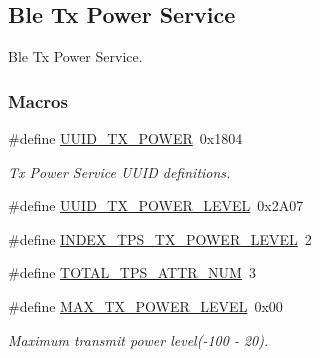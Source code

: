 \hypertarget{group___b_l_e___t_p_s}{}\subsection{Ble Tx Power Service}
\label{group___b_l_e___t_p_s}


Ble Tx Power Service.  


\subsubsection*{Macros}
\begin{DoxyCompactItemize}
\item 
\#define \hyperlink{group___b_l_e___t_p_s_ga7a50af16b0cd4f07b9a1503e8559b6cc}{U\+U\+I\+D\+\_\+\+T\+X\+\_\+\+P\+O\+W\+ER}~0x1804
\begin{DoxyCompactList}\small\item\em Tx Power Service U\+U\+ID definitions. \end{DoxyCompactList}\item 
\#define \hyperlink{group___b_l_e___t_p_s_gabb35fb64537acb5094f3a1d93b522890}{U\+U\+I\+D\+\_\+\+T\+X\+\_\+\+P\+O\+W\+E\+R\+\_\+\+L\+E\+V\+EL}~0x2\+A07
\item 
\#define \hyperlink{group___b_l_e___t_p_s_gad42a301a5c3a66931412a7aa30d06037}{I\+N\+D\+E\+X\+\_\+\+T\+P\+S\+\_\+\+T\+X\+\_\+\+P\+O\+W\+E\+R\+\_\+\+L\+E\+V\+EL}~2
\item 
\#define \hyperlink{group___b_l_e___t_p_s_gafed7d42c4161b20c2af4d216d95d76da}{T\+O\+T\+A\+L\+\_\+\+T\+P\+S\+\_\+\+A\+T\+T\+R\+\_\+\+N\+UM}~3
\item 
\#define \hyperlink{group___b_l_e___t_p_s_gaecf59825946a8022eeb622b5f9a8626e}{M\+A\+X\+\_\+\+T\+X\+\_\+\+P\+O\+W\+E\+R\+\_\+\+L\+E\+V\+EL}~0x00\hypertarget{group___b_l_e___t_p_s_gaecf59825946a8022eeb622b5f9a8626e}{}\label{group___b_l_e___t_p_s_gaecf59825946a8022eeb622b5f9a8626e}

\begin{DoxyCompactList}\small\item\em Maximum transmit power level(-\/100 -\/ 20). \end{DoxyCompactList}\end{DoxyCompactItemize}
